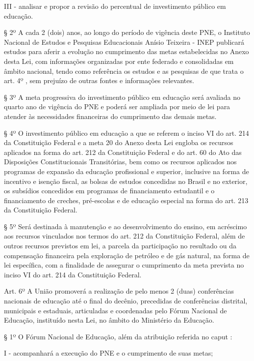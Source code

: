 \documentclass[
]{book}
\begin{document}
III - analisar e propor a revisão do percentual de investimento público em educação.

§ 2º A cada 2 (dois) anos, ao longo do período de vigência deste PNE, o Instituto Nacional de Estudos e Pesquisas Educacionais Anísio Teixeira - INEP publicará estudos para aferir a evolução no cumprimento das metas estabelecidas no Anexo desta Lei, com informações organizadas por ente federado e consolidadas em âmbito nacional, tendo como referência os estudos e as pesquisas de que trata o art. 4º , sem prejuízo de outras fontes e informações relevantes.

§ 3º A meta progressiva do investimento público em educação será avaliada no quarto ano de vigência do PNE e poderá ser ampliada por meio de lei para atender às necessidades financeiras do cumprimento das demais metas.

§ 4º O investimento público em educação a que se referem o inciso VI do art. 214 da Constituição Federal e a meta 20 do Anexo desta Lei engloba os recursos aplicados na forma do art. 212 da Constituição Federal e do art. 60 do Ato das Disposições Constitucionais Transitórias, bem como os recursos aplicados nos programas de expansão da educação profissional e superior, inclusive na forma de incentivo e isenção fiscal, as bolsas de estudos concedidas no Brasil e no exterior, os subsídios concedidos em programas de financiamento estudantil e o financiamento de creches, pré-escolas e de educação especial na forma do art. 213 da Constituição Federal.

§ 5º Será destinada à manutenção e ao desenvolvimento do ensino, em acréscimo aos recursos vinculados nos termos do art. 212 da Constituição Federal, além de outros recursos previstos em lei, a parcela da participação no resultado ou da compensação financeira pela exploração de petróleo e de gás natural, na forma de lei específica, com a finalidade de assegurar o cumprimento da meta prevista no inciso VI do art. 214 da Constituição Federal.

Art. 6º A União promoverá a realização de pelo menos 2 (duas) conferências nacionais de educação até o final do decênio, precedidas de conferências distrital, municipais e estaduais, articuladas e coordenadas pelo Fórum Nacional de Educação, instituído nesta Lei, no âmbito do Ministério da Educação.

§ 1º O Fórum Nacional de Educação, além da atribuição referida no caput :

I - acompanhará a execução do PNE e o cumprimento de suas metas;
\end{document}
